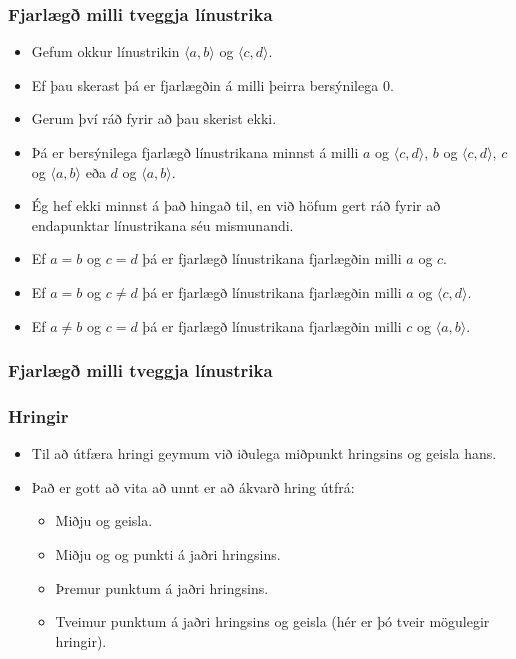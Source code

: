 \documentclass{beamer}
\newcommand\env[2]
{
	\begin{#1}
	#2
	\end{#1}
}
\newcommand\code[1]{\tiny}
\begin{document}
\env{frame}
{
	\frametitle{Fjarlægð milli tveggja línustrika}
	\env{itemize}
	{
		\item<1-> Gefum okkur línustrikin $\langle a, b \rangle$ og $\langle c, d \rangle$.
		\item<2-> Ef þau skerast þá er fjarlægðin á milli þeirra bersýnilega $0$.
		\item<3-> Gerum því ráð fyrir að þau skerist ekki.
		\item<4-> Þá er bersýnilega fjarlægð línustrikana minnst á milli 
			$a$ og $\langle c, d \rangle$, 
			$b$ og $\langle c, d \rangle$, 
			$c$ og $\langle a, b \rangle$ eða 
			$d$ og $\langle a, b \rangle$.
		\item<5-> Ég hef ekki minnst á það hingað til, en við höfum gert ráð fyrir að endapunktar 
			línustrikana séu mismunandi.
		\item<6-> Ef $a = b$ og $c = d$ þá er fjarlægð línustrikana fjarlægðin milli $a$ og $c$.
		\item<7-> Ef $a = b$ og $c \neq d$ þá er fjarlægð línustrikana fjarlægðin milli $a$ og $\langle c, d \rangle$.
		\item<8-> Ef $a \neq b$ og $c = d$ þá er fjarlægð línustrikana fjarlægðin milli $c$ og $\langle a, b \rangle$.
	}
}

\env{frame}
{
	\frametitle{Fjarlægð milli tveggja línustrika}
	\code{l2l.h}
}

\env{frame}
{
	\frametitle{Hringir}
	\env{itemize}
	{
		\item<1-> Til að útfæra hringi geymum við iðulega miðpunkt hringsins og geisla hans.
		\item<2-> Það er gott að vita að unnt er að ákvarð hring útfrá:
		\env{itemize}
		{
			\item<3-> Miðju og geisla.
			\item<4-> Miðju og og punkti á jaðri hringsins.
			\item<5-> Þremur punktum á jaðri hringsins.
			\item<6-> Tveimur punktum á jaðri hringsins og geisla (hér er þó tveir mögulegir hringir).
		}
	}
}
\end{document}
